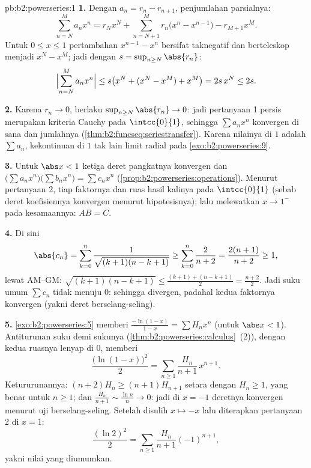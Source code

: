 \begin{solution}{pb:b2:powerseries:1}
\textbf{1.} Dengan $a_n = r_n - r_{n+1}$, penjumlahan parsialnya:
\[
\sum_{n=N}^{M} a_nx^n
= r_Nx^N + \sum_{n=N+1}^{M} r_n\bigl(x^n - x^{n-1}\bigr)
- r_{M+1}x^M .
\]
Untuk $0 \leq x \leq 1$ pertambahan $x^{n-1} - x^n$ bersifat
taknegatif dan berteleskop menjadi $x^N - x^M$; jadi dengan $s = \sup_{n\geq
N}\abs{r_n}$:
\[
\Bigl|\sum_{n=N}^{M}a_nx^n\Bigr|
\leq s\bigl(x^N + (x^N - x^M) + x^M\bigr) = 2s\,x^N \leq 2s .
\]

\textbf{2.} Karena $r_n \to 0$, berlaku $\sup_{n\geq N}\abs{r_n} \to 0$:
jadi pertanyaan 1 persis merupakan kriteria Cauchy  pada
$\intcc{0}{1}$, sehingga $\sum a_nx^n$ konvergen  di sana dan
jumlahnya  (\cref{thm:b2:funcseq:seriestransfer}).
Karena nilainya di $1$ adalah $\sum a_n$, kekontinuan di $1$ tak lain
limit radial pada \cref{exo:b2:powerseries:9}.

\textbf{3.} Untuk $\abs x < 1$ ketiga deret pangkatnya konvergen
 dan $\bigl(\sum a_nx^n\bigr)\bigl(\sum b_nx^n\bigr)
= \sum c_nx^n$ (\cref{prop:b2:powerseries:operations}). Menurut
pertanyaan 2, tiap faktornya dan ruas hasil kalinya  pada
$\intcc{0}{1}$ (sebab deret koefisiennya konvergen menurut
hipotesisnya); lalu melewatkan $x \to 1^-$ pada kesamaannya: $AB = C$.

\textbf{4.} Di sini
\[
\abs{c_n} = \sum_{k=0}^{n}
\frac{1}{\sqrt{(k+1)(n-k+1)}}
\geq \sum_{k=0}^{n}\frac{2}{n+2}
= \frac{2(n+1)}{n+2} \geq 1,
\]
lewat AM--GM: $\sqrt{(k+1)(n-k+1)} \leq \frac{(k+1) +
(n-k+1)}{2} = \frac{n+2}{2}$. Jadi suku umum $\sum c_n$
tidak menuju $0$: sehingga  divergen, padahal
kedua faktornya konvergen (yakni deret berselang-seling).

\textbf{5.} \cref{exo:b2:powerseries:5} memberi
$\frac{-\ln(1-x)}{1-x} = \sum H_nx^n$ (untuk $\abs x < 1$).
Antiturunan suku demi sukunya
(\cref{thm:b2:powerseries:calculus}~(2)), dengan kedua ruasnya lenyap
di $0$, memberi
\[
\frac{\bigl(\ln(1-x)\bigr)^2}{2}
= \sum_{n\geq1}\frac{H_n}{n+1}\,x^{n+1} .
\]
Ketururunannya: $(n+2)H_n \geq (n+1)H_{n+1}$ setara dengan $H_n \geq
1$, yang benar untuk $n \geq 1$; dan $\frac{H_n}{n+1} \sim \frac{\ln
n}{n} \to 0$: jadi di $x = -1$ deretnya konvergen menurut
uji berselang-seling. Setelah disulih $x \mapsto -x$ lalu diterapkan
pertanyaan 2 di $x = 1$:
\[
\frac{(\ln 2)^2}{2}
= \sum_{n\geq1}\frac{H_n}{n+1}(-1)^{n+1},
\]
yakni nilai yang diumumkan.


\end{solution}
